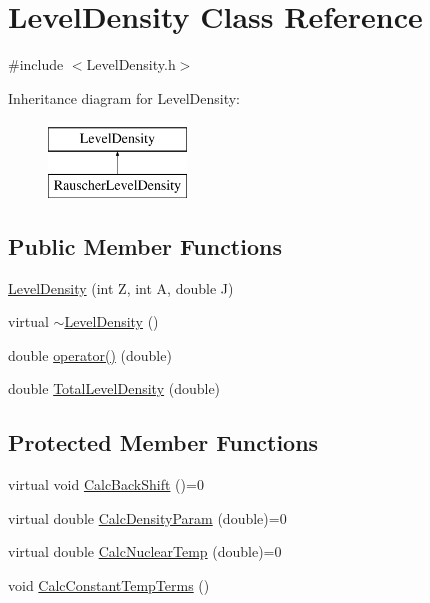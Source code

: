 \hypertarget{classLevelDensity}{\section{Level\-Density Class Reference}
\label{classLevelDensity}
}


{\ttfamily \#include $<$Level\-Density.\-h$>$}

Inheritance diagram for Level\-Density\-:\begin{figure}[H]
\begin{center}
\leavevmode
\includegraphics[height=2.000000cm]{d5/d00/classLevelDensity}
\end{center}
\end{figure}
\subsection*{Public Member Functions}
\begin{DoxyCompactItemize}
\item 
\hyperlink{classLevelDensity_ae38bbf8823d4edf4d78ae36cfb06c49f}{Level\-Density} (int Z, int A, double J)
\item 
virtual \hyperlink{classLevelDensity_abe9cc580b71e8c0adfb4f137778cd17b}{$\sim$\-Level\-Density} ()
\item 
double \hyperlink{classLevelDensity_a7ac3ac01c14a34c727cb60c485a5653d}{operator()} (double)
\item 
double \hyperlink{classLevelDensity_aaf525f64721eaf5cc8e32b1147818864}{Total\-Level\-Density} (double)
\end{DoxyCompactItemize}
\subsection*{Protected Member Functions}
\begin{DoxyCompactItemize}
\item 
virtual void \hyperlink{classLevelDensity_a2aa1bbc8192a97c45be4f049dbd2dcc0}{Calc\-Back\-Shift} ()=0
\item 
virtual double \hyperlink{classLevelDensity_a42de1e15ee79bc984923b29b44ec55d5}{Calc\-Density\-Param} (double)=0
\item 
virtual double \hyperlink{classLevelDensity_a6a19c56e9784c0f1dac0ca2b86397c20}{Calc\-Nuclear\-Temp} (double)=0
\item 
void \hyperlink{classLevelDensity_ab113ee9e46b56bd88e02da587389e885}{Calc\-Constant\-Temp\-Terms} ()
\end{DoxyCompactItemize}
